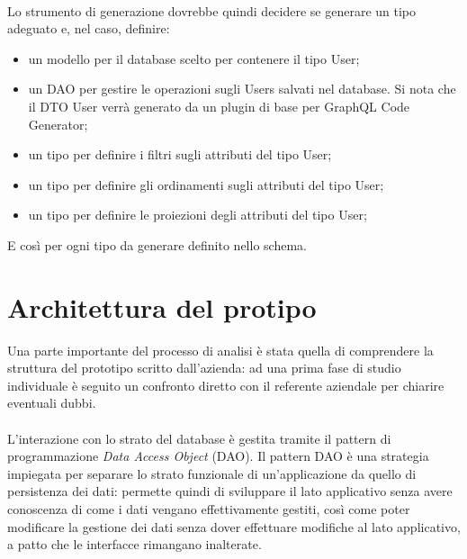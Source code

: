 \documentclass[a4paper, 12pt]{report}
\begin{document}
      \paragraph*{}
      Lo strumento di generazione dovrebbe quindi decidere se generare un tipo adeguato e, nel caso, definire:
      \begin{itemize}
        \item un modello per il database scelto per contenere il tipo User;
        \item un DAO per gestire le operazioni sugli Users salvati nel database. Si nota che il DTO User verrà generato da un plugin di base per GraphQL Code Generator;
        \item un tipo per definire i filtri sugli attributi del tipo User;
        \item un tipo per definire gli ordinamenti sugli attributi del tipo User;
        \item un tipo per definire le proiezioni degli attributi del tipo User;
      \end{itemize}
      E così per ogni tipo da generare definito nello schema.
    \section{Architettura del protipo}
      Una parte importante del processo di analisi è stata quella di comprendere la struttura del prototipo scritto dall'azienda: ad una prima fase di studio individuale è seguito un confronto diretto con il referente aziendale per chiarire eventuali dubbi.
      \paragraph*{}
      L'interazione con lo strato del database è gestita tramite il pattern di programmazione \emph{Data Access Object} (DAO).
      Il pattern DAO è una strategia impiegata per separare lo strato funzionale di un'applicazione da quello di persistenza dei dati: permette quindi di sviluppare il lato applicativo senza avere conoscenza di come i dati vengano effettivamente gestiti, così come poter modificare la gestione dei dati
      senza dover effettuare modifiche al lato applicativo, a patto che le interfacce rimangano inalterate.
\end{document}
